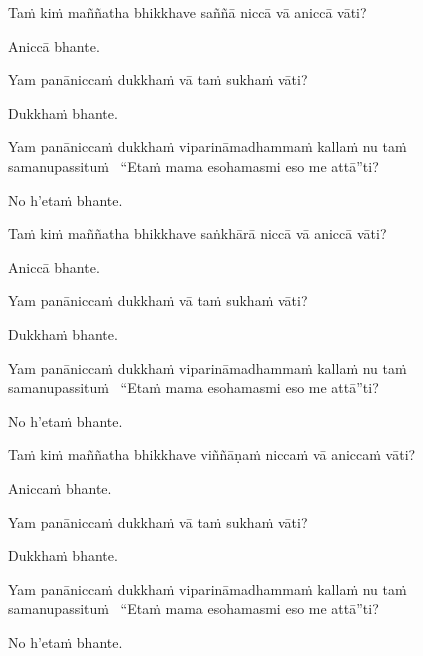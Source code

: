 \begin{pali-hang}
  Taṁ kiṁ maññatha bhikkhave saññā niccā vā aniccā vāti?
\end{pali-hang}
\begin{pali-hangtogether}
  Aniccā bhante.
\end{pali-hangtogether}
\begin{pali-hangtogether}
  Yam panāniccaṁ dukkhaṁ vā taṁ sukhaṁ vāti?
\end{pali-hangtogether}
\begin{pali-hangtogether}
  Dukkhaṁ bhante.
\end{pali-hangtogether}
\begin{pali-hangtogether}
  Yam panāniccaṁ dukkhaṁ viparināmadhammaṁ kallaṁ nu taṁ samanupassituṁ \breathmark\ ``Etaṁ mama esohamasmi eso me attā''ti?
\end{pali-hangtogether}
\begin{pali-hangtogether}
  No h'etaṁ bhante.
\end{pali-hangtogether}

\begin{pali-hang}
  Taṁ kiṁ maññatha bhikkhave saṅkhārā niccā vā aniccā vāti?
\end{pali-hang}
\begin{pali-hangtogether}
  Aniccā bhante.
\end{pali-hangtogether}
\begin{pali-hangtogether}
  Yam panāniccaṁ dukkhaṁ vā taṁ sukhaṁ vāti?
\end{pali-hangtogether}
\begin{pali-hangtogether}
  Dukkhaṁ bhante.
\end{pali-hangtogether}
\begin{pali-hangtogether}
  Yam panāniccaṁ dukkhaṁ viparināmadhammaṁ kallaṁ nu taṁ samanupassituṁ \breathmark\ ``Etaṁ mama esohamasmi eso me attā''ti?
\end{pali-hangtogether}
\begin{pali-hangtogether}
  No h'etaṁ bhante.
\end{pali-hangtogether}

\begin{pali-hang}
  Taṁ kiṁ maññatha bhikkhave viññāṇaṁ niccaṁ vā aniccaṁ vāti?
\end{pali-hang}
\begin{pali-hangtogether}
  Aniccaṁ bhante.
\end{pali-hangtogether}
\begin{pali-hangtogether}
  Yam panāniccaṁ dukkhaṁ vā taṁ sukhaṁ vāti?
\end{pali-hangtogether}
\begin{pali-hangtogether}
  Dukkhaṁ bhante.
\end{pali-hangtogether}
\begin{pali-hangtogether}
  Yam panāniccaṁ dukkhaṁ viparināmadhammaṁ kallaṁ nu taṁ samanupassituṁ \breathmark\ ``Etaṁ mama esohamasmi eso me attā''ti?
\end{pali-hangtogether}
\begin{pali-hangtogether}
  No h'etaṁ bhante.
\end{pali-hangtogether}

